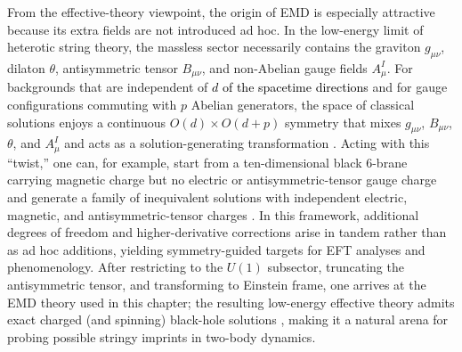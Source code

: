From the effective-theory viewpoint, the origin of EMD is especially attractive because its extra fields are not introduced ad hoc. In the low-energy limit of heterotic string theory, the massless sector necessarily contains the graviton \(g_{\mu\nu}\), dilaton \(\theta\), antisymmetric tensor \(B_{\mu\nu}\), and non-Abelian gauge fields \(A_\mu^{I}\). For backgrounds that are independent of \textcolor{black}{\(d\) of the spacetime directions} and for gauge configurations commuting with \(p\) Abelian generators, the space of classical solutions enjoys a continuous \(O(d)\times O(d+p)\) symmetry that mixes \(g_{\mu\nu}\), \(B_{\mu\nu}\), \(\theta\), and \(A_\mu^{I}\) and acts as a solution-generating transformation \cite{Hassan:1991mq}. Acting with this “twist,” one can, for example, start from a ten-dimensional black 6-brane carrying magnetic charge but no electric or antisymmetric-tensor gauge charge and generate a family of inequivalent solutions with independent electric, magnetic, and antisymmetric-tensor charges \cite{Hassan:1991mq}. In this framework, additional degrees of freedom and higher-derivative corrections arise in tandem rather than as ad hoc additions, yielding symmetry-guided targets for EFT analyses and phenomenology. After restricting to the \(U(1)\) subsector, truncating the antisymmetric tensor, and transforming to Einstein frame, one arrives at the EMD theory used in this chapter; the resulting low-energy effective theory admits exact charged (and spinning) black-hole solutions \cite{GIBBONS1988741,Garfinkle:1990qj,Sen:1992ua}, making it a natural arena for probing possible stringy imprints in two-body dynamics.

